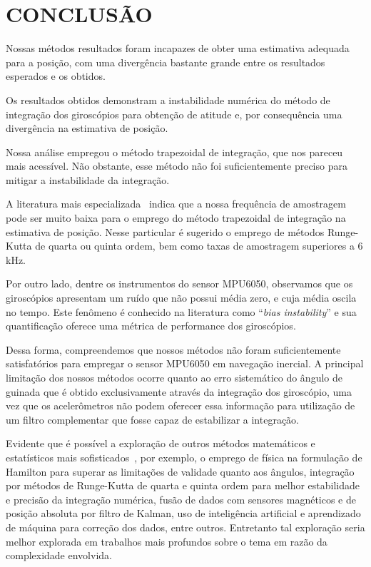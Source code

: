 \chapter*{CONCLUSÃO}\label{chap:conclusao}

Nossas métodos resultados foram incapazes de obter uma estimativa adequada para a posição, com uma divergência bastante grande entre os resultados esperados e os obtidos.

Os resultados obtidos demonstram a instabilidade numérica do método de integração dos giroscópios para obtenção de atitude e, por consequência uma divergência na estimativa de posição.

Nossa análise empregou o método trapezoidal de integração, que nos pareceu mais acessível. Não obstante, esse método não foi suficientemente preciso para mitigar a instabilidade da integração.

A literatura mais especializada~\cite{SAVAGE_2008} indica que a nossa frequência de amostragem pode ser muito baixa para o emprego do método trapezoidal de integração na estimativa de posição.
Nesse particular é sugerido o emprego de métodos Runge-Kutta de quarta ou quinta ordem, bem como taxas de amostragem superiores a 6 kHz.

Por outro lado, dentre os instrumentos do sensor MPU6050, observamos que os giroscópios apresentam um ruído que não possui média zero, e cuja média oscila no tempo. Este fenômeno é conhecido na literatura como ``\emph{bias instability}'' e sua quantificação oferece uma métrica de performance dos giroscópios.

Dessa forma, compreendemos que nossos métodos não foram suficientemente satisfatórios para empregar o sensor MPU6050 em navegação inercial. A principal limitação dos nossos métodos ocorre quanto ao erro sistemático do ângulo de guinada que é obtido exclusivamente através da integração dos giroscópio, uma vez que os acelerômetros não podem oferecer essa informação para utilização de um filtro complementar que fosse capaz de estabilizar a integração.

Evidente que é possível a exploração de outros métodos matemáticos e estatísticos mais sofisticados~\cite{SAVAGE_2008_2}, por exemplo, o emprego de física na formulação de Hamilton para superar as limitações de validade quanto aos ângulos, integração por métodos de Runge-Kutta de quarta e quinta ordem para melhor estabilidade e precisão da integração numérica, fusão de dados com sensores magnéticos e de posição absoluta por filtro de Kalman, uso de inteligência artificial e aprendizado de máquina para correção dos dados, entre outros. Entretanto tal exploração seria melhor explorada em trabalhos mais profundos sobre o tema em razão da complexidade envolvida.
